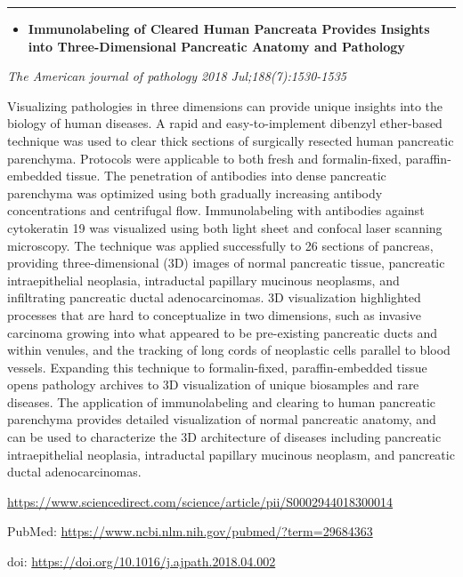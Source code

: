 \documentclass[]{article}
\providecommand{\tightlist}{%
  \setlength{\itemsep}{0pt}\setlength{\parskip}{0pt}}
\begin{document}
\begin{center}\rule{0.5\linewidth}{\linethickness}\end{center}

\begin{itemize}
\tightlist
\item
  \textbf{Immunolabeling of Cleared Human Pancreata Provides Insights
  into Three-Dimensional Pancreatic Anatomy and Pathology}
\end{itemize}

\emph{The American journal of pathology 2018 Jul;188(7):1530-1535}

Visualizing pathologies in three dimensions can provide unique insights
into the biology of human diseases. A rapid and easy-to-implement
dibenzyl ether-based technique was used to clear thick sections of
surgically resected human pancreatic parenchyma. Protocols were
applicable to both fresh and formalin-fixed, paraffin-embedded tissue.
The penetration of antibodies into dense pancreatic parenchyma was
optimized using both gradually increasing antibody concentrations and
centrifugal flow. Immunolabeling with antibodies against cytokeratin 19
was visualized using both light sheet and confocal laser scanning
microscopy. The technique was applied successfully to 26 sections of
pancreas, providing three-dimensional (3D) images of normal pancreatic
tissue, pancreatic intraepithelial neoplasia, intraductal papillary
mucinous neoplasms, and infiltrating pancreatic ductal adenocarcinomas.
3D visualization highlighted processes that are hard to conceptualize in
two dimensions, such as invasive carcinoma growing into what appeared to
be pre-existing pancreatic ducts and within venules, and the tracking of
long cords of neoplastic cells parallel to blood vessels. Expanding this
technique to formalin-fixed, paraffin-embedded tissue opens pathology
archives to 3D visualization of unique biosamples and rare diseases. The
application of immunolabeling and clearing to human pancreatic
parenchyma provides detailed visualization of normal pancreatic anatomy,
and can be used to characterize the 3D architecture of diseases
including pancreatic intraepithelial neoplasia, intraductal papillary
mucinous neoplasm, and pancreatic ductal adenocarcinomas.

\url{https://www.sciencedirect.com/science/article/pii/S0002944018300014}

PubMed: \url{https://www.ncbi.nlm.nih.gov/pubmed/?term=29684363}

doi: \url{https://doi.org/10.1016/j.ajpath.2018.04.002}
\end{document}

